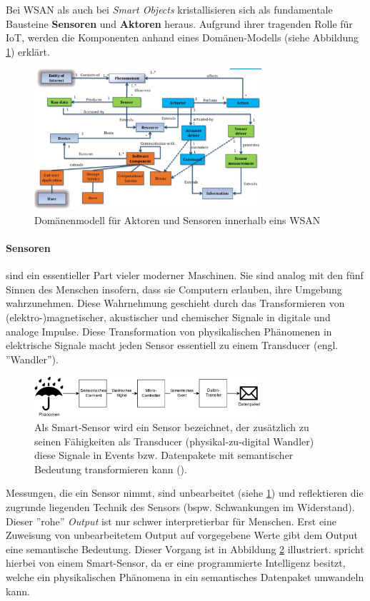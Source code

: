 Bei \ac{WSAN} als auch bei \textit{Smart Objects} kristallisieren sich als fundamentale Bausteine \textbf{Sensoren} und \textbf{Aktoren} heraus. Aufgrund ihrer tragenden Rolle für \ac{IoT}, werden die Komponenten anhand eines Domänen-Modells (siehe Abbildung \ref{fig:ActuatorSensorDomainmodel}) erklärt.
\begin{figure}[h]
    \centering
    \includegraphics[width=0.75\textwidth]{bilder/chapter2/domainmodel.png}
    \caption{Domänenmodell für Aktoren und Sensoren innerhalb eins \ac{WSAN}}
    \label{fig:ActuatorSensorDomainmodel}
\end{figure}

\paragraph{Sensoren} sind ein essentieller Part vieler moderner Maschinen. Sie sind analog mit den fünf Sinnen des Menschen insofern, dass sie Computern erlauben, ihre Umgebung wahrzunehmen. Diese Wahrnehmung geschieht durch das Transformieren von (elektro-)magnetischer, akustischer und chemischer Signale in digitale und analoge Impulse. Diese Transformation von physikalischen Phänomenen in elektrische Signale macht jeden Sensor essentiell zu einem Transducer (engl. ''Wandler''). 
\begin{figure}[h]
    \centering
    \includegraphics[width=0.75\textwidth]{bilder/chapter2/smartsensor.png}
    \caption{Als Smart-Sensor wird ein Sensor bezeichnet, der zusätzlich zu seinen Fähigkeiten als Transducer (physikal-zu-digital Wandler) diese Signale in Events bzw. Datenpakete mit semantischer Bedeutung transformieren kann (\cite{rayes2017internet}).}
    \label{fig:Smartsensor}
\end{figure}
Messungen, die ein Sensor nimmt, sind unbearbeitet (siehe \ref{fig:ActuatorSensorDomainmodel}) und reflektieren die zugrunde liegenden Technik des Sensors (bspw. Schwankungen im Widerstand). Dieser ''rohe'' \textit{Output} ist nur schwer interpretierbar für Menschen. Erst eine Zuweisung von unbearbeitetem Output auf vorgegebene Werte gibt dem Output eine semantische Bedeutung. Dieser Vorgang ist in Abbildung \ref{fig:Smartsensor} illustriert. \cite{rayes2017internet} spricht hierbei von einem Smart-Sensor, da er eine programmierte Intelligenz besitzt, welche ein physikalischen Phänomena in ein semantisches Datenpaket umwandeln kann.

